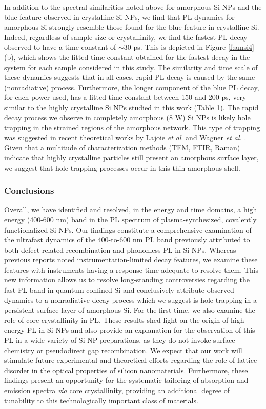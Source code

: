 In addition to the spectral similarities noted above for amorphous Si NPs and the blue feature observed in crystalline Si NPs, we find that PL dynamics for amorphous Si strongly resemble those found for the blue feature in crystalline Si. Indeed, regardless of sample size or crystallinity, we find the fastest PL decay observed to have a time constant of $\sim$30 ps. This is depicted in Figure \ref{f:amsi4}(b), which shows the fitted time constant obtained for the fastest decay in the system for each sample considered in this study. The similarity and time scale of these dynamics suggests that in all cases, rapid PL decay is caused by the same (nonradiative) process. Furthermore, the longer component of the blue PL decay, for each power used, has a fitted time constant between 150 and 200 ps, very similar to the highly crystalline Si NPs studied in this work (Table 1). The rapid decay process we observe in completely amorphous (8 W) Si NPs is likely hole trapping in the strained regions of the amorphous network. This type of trapping was suggested in recent theoretical works by Lajoie \emph{et al}. \cite{lajoie2010optical} and Wagner \emph{et al.} \cite{wagner2008microscopic}. Given that a multitude of characterization methods (TEM, FTIR, Raman) indicate that highly crystalline particles still present an amorphous surface layer, we suggest that hole trapping processes occur in this thin amorphous shell. \par

\subsubsection{Conclusions}
Overall, we have identified and resolved, in the energy and time domains, a high energy (400-600 nm) band in the PL spectrum of plasma-synthesized, covalently functionalized Si NPs. Our findings constitute a comprehensive examination of the ultrafast dynamics of the 400-to-600 nm PL band previously attributed to both defect-related recombination and phononless PL in Si NPs. Whereas previous reports noted instrumentation-limited decay features, we examine these features with instruments having a response time adequate to resolve them. This new information allows us to resolve long-standing controversies regarding the fast PL band in quantum confined Si and conclusively attribute observed dynamics to a nonradiative decay process which we suggest is hole trapping in a persistent surface layer of amorphous Si. For the first time, we also examine the role of core crystallinity in PL. These results shed light on the origin of high energy PL in Si NPs and also provide an explanation for the observation of this PL in a wide variety of Si NP preparations, as they do not invoke surface chemistry or pseudodirect gap recombination. We expect that our work will stimulate future experimental and theoretical efforts regarding the role of lattice disorder in the optical properties of silicon nanomaterials. Furthermore, these findings present an opportunity for the systematic tailoring of absorption and emission spectra \emph{via} core crystallinity, providing an additional degree of tunability to this technologically important class of materials.
